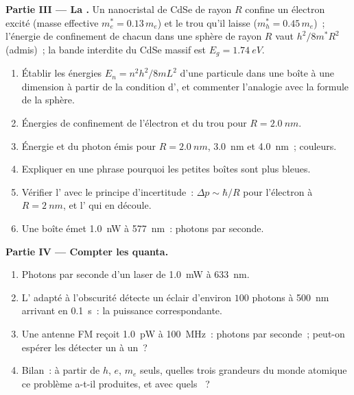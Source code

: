 \begin{problem}
\medskip
\noindent\textbf{Partie III --- La .}
Un nanocristal de CdSe de rayon $R$ confine un électron excité
(masse effective $m_e^\ast = 0.13\,m_e$) et le trou qu'il laisse
($m_h^\ast = 0.45\,m_e$)~; l'énergie de confinement de chacun dans une
sphère de rayon $R$ vaut $h^2/8m^\ast R^2$ (admis)~; la bande interdite du CdSe massif est
$E_g = \qty{1.74}{eV}$.
\begin{enumerate}[resume]
  \item Établir les énergies $E_n = n^2h^2/8mL^2$ d'une particule dans une
        boîte à une dimension à partir de la condition d', et commenter l'analogie avec la formule de la sphère.
  \item Énergies de confinement de l'électron et du trou pour
        $R = \qty{2.0}{nm}$.
  \item Énergie et  du photon émis pour $R = \qty{2.0}{nm}$,
        \qty{3.0}{nm} et \qty{4.0}{nm}~; couleurs.
  \item Expliquer en une phrase pourquoi les petites boîtes sont plus bleues.
  \item Vérifier l' avec le principe d'incertitude~:
        $\Delta p \sim \hbar/R$ pour l'électron à $R = \qty{2}{nm}$, et
        l' qui en découle.
  \item Une boîte émet \qty{1.0}{nW} à \qty{577}{nm}~: photons par seconde.
\end{enumerate}

\medskip
\noindent\textbf{Partie IV --- Compter les quanta.}
\begin{enumerate}[resume]
  \item Photons par seconde d'un laser de \qty{1.0}{mW} à \qty{633}{nm}.
  \item L' adapté à l'obscurité détecte un éclair d'environ $100$ photons
        à \qty{500}{nm} arrivant en \qty{0.1}{s}~: la puissance correspondante.
  \item Une antenne FM reçoit \qty{1.0}{pW} à \qty{100}{MHz}~: photons par
        seconde~; peut-on espérer les détecter un à un~?
  \item Bilan~: à partir de $h$, $e$, $m_e$ seuls, quelles trois grandeurs du
        monde atomique ce problème a-t-il produites, et avec quels ~?
\end{enumerate}
\end{problem}

